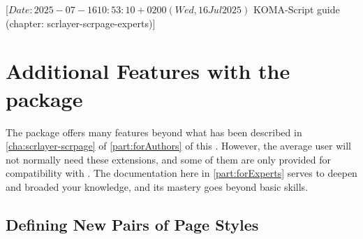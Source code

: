 %
%
%
%
%
%
%

%
                 [$Date: 2025-07-16 10:53:10 +0200 (Wed, 16 Jul 2025) $
                  KOMA-Script guide (chapter: scrlayer-scrpage-experts)]

\chapter[{Additional Features of \Package{scrlayer-scrpage}}]
  {Additional Features with
    the  package}
%
\BeginIndexGroup
{}%
The  package offers many features beyond what has
been described in \autoref{cha:scrlayer-scrpage} of \autoref{part:forAuthors}
of this . However, the average user will not normally need
these extensions, and some of them are only provided for compatibility with
. The documentation here in \autoref{part:forExperts} serves
to deepen and broaded your knowledge, and its mastery goes beyond basic
skills.


\section{Defining New Pairs of Page Styles}

